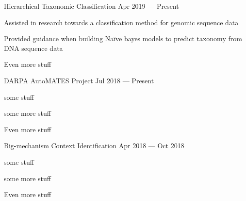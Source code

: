 \vspace{-0.5cm}

\begin{cventries}

  \cventry
    {} %
    {Hierarchical Taxonomic Classification} %
    {Apr 2019 --- Present} %
    {} %
    {
      \vspace{-0.5cm}
      \begin{cvitems} %
        \item Assisted in research towards a classification method for genomic sequence data
        \item Provided guidance when building Naïve bayes models to predict taxonomy from DNA sequence data
        \item Even more stuff
      \end{cvitems}
    }

  \cventry
    {} %
    {DARPA AutoMATES Project} %
    {Jul 2018 --- Present} %
    {} %
    {
      \vspace{-0.5cm}
      \begin{cvitems} %
        \item some stuff
        \item some more stuff
        \item Even more stuff
      \end{cvitems}
    }

  \cventry
    {} %
    {Big-mechanism Context Identification} %
    {Apr 2018 --- Oct 2018} %
    {} %
    {
      \vspace{-0.5cm}
      \begin{cvitems} %
        \item some stuff
        \item some more stuff
        \item Even more stuff
      \end{cvitems}
    }



\end{cventries}
